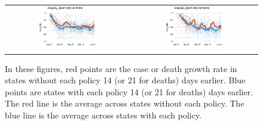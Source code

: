 \documentclass[11pt,reqno,letter]{amsart}
\theoremstyle{definition}
\begin{document}
\begin{figure}
\begin{minipage}{\linewidth}
\begin{tabular}{cc}
      \\
      \includegraphics[width=0.483\textwidth]{tables_and_figures/pshelter-cases-14}
      &
        \includegraphics[width=0.483\textwidth]{tables_and_figures/pshelter-deaths-21}
      \\
    \end{tabular}
  \end{minipage}
     \begin{flushleft}
      \footnotesize In these figures, red points are the case or death
      growth rate in states without each policy 14 (or 21 for deaths)
      days earlier. Blue points are states with each policy 14 (or 21
      for deaths) days earlier. The red line is the average across
      states without each policy. The blue line is the average across
      states with each policy.    \end{flushleft}\end{figure}
\end{document}

